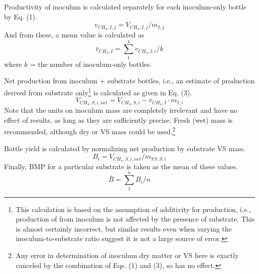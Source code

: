 \documentclass[]{article}
\begin{document}
Productivity of inoculum is calculated separately for each inoculum-only bottle by Eq. (1).
\begin{equation}
  \label{eq:inoc_production}
  v_{CH_4, I, j} = V_{CH_4, I, j} / m_{I, j} 
\end{equation}
And from these, a mean value is calculated as 
\begin{equation}
  \label{eq:inoc_productivity}
  \bar{v}_{CH_4, I} = \sum_1 ^k v_{CH_4, I, i} / k
\end{equation}
where $k$ = the number of inoculum-only bottles.

Net  production from inoculum + substrate bottles, i.e., an estimate of  production derived from substrate only\footnote{This calculation is based on the assumption of additivity for  production, i.e., production of  from inoculum is not affected by the presence of substrate. This is almost certainly incorrect, but similar results even when varying the inoculum-to-substrate ratio suggest it is not a large source of error.} is calculated as given in Eq. (3).
\begin{equation}
  \label{eq:net_CH4}
  V_{CH_4, S, i, net} = V_{CH_4, S, i} - \bar{v}_{CH_4, I} \cdot m_{I, i}
\end{equation}
Note that the units on inoculum mass are completely irrelevant and have no effect of results, as long as they are sufficiently precise.
Fresh (wet) mass is recommended, although dry or VS mass could be used.\footnote{Any error in determination of inoculum dry matter or VS here is exactly canceled by the combination of Eqs. (1) and (3), so has no effect.}

Bottle yield is calculated by normalizing net  production by substrate VS mass.
\begin{equation}
  \label{eq:yield}
  B_{i} = V_{CH_4, S, i, net} / m_{VS, S, i}
\end{equation}
Finally, BMP for a particular substrate is taken as the mean of these values.
\begin{equation}
  \label{eq:BMP}
  \bar{B} = \sum_1 ^n B_{i} / n
\end{equation}
\end{document}
